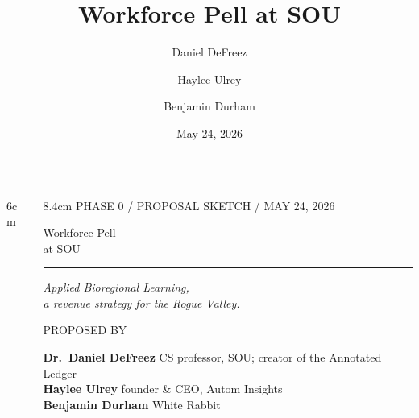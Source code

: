 \documentclass[aspectratio=169,11pt]{beamer}
\title{Workforce Pell at SOU}
\author{Daniel DeFreez \and Haylee Ulrey \and Benjamin Durham}
\institute{Southern Oregon University \textbullet{} Autom Insights \textbullet{} White Rabbit}
\date{May 24, 2026}
\newcommand{\eyebrow}[1]{%
  {\sffamily\fontsize{7.5pt}{9pt}\selectfont
   \color{textMuted}%
   \MakeUppercase{#1}%
  }%
}
\newcommand{\cubeShape}[3]{%
  \begin{scope}[shift={(#2,#3)},scale=#1,
                every node/.style={font=\scriptsize}]
    \draw[cube wire] (-0.6,-0.4) rectangle (0.6,0.4);
    \draw[cube wire] (0.6,0.4) -- (0.85,0.55) -- (-0.35,0.55) -- (-0.6,0.4);
    \draw[cube wire] (0.6,-0.4) -- (0.85,-0.25) -- (0.85,0.55);
    \draw[cube dash] (-0.6,-0.4) -- (-0.35,-0.25) -- (0.85,-0.25);
    \draw[cube dash] (-0.35,-0.25) -- (-0.35,0.55);
    \fill[cSou]    (-0.42,-0.08) rectangle (-0.27,0.05);
    \fill[cSoredi] (-0.075,0.10) rectangle (0.075,0.23);
    \fill[cBiz]    ( 0.27,-0.08) rectangle ( 0.42,0.05);
    \fill[cWr]     (-0.42, 0.17) rectangle (-0.27,0.30);
    \fill[cRwp]    ( 0.27, 0.17) rectangle ( 0.42,0.30);
  \end{scope}%
}
\begin{document}
{
\begin{frame}[plain]
  \vspace*{0.5cm}
  \begin{columns}[c,onlytextwidth,totalwidth=14.5cm]
    \begin{column}{6cm}
      \centering
    \end{column}
    \begin{column}{8.4cm}
      \eyebrow{Phase 0 / proposal sketch / May 24, 2026}\par
      \vspace{8pt}
      {\displayfont\fontsize{28pt}{32pt}\selectfont\color{textPrimary}%
       Workforce Pell\\at SOU\par}
      \vspace{6pt}
      {\color{oil}\rule{2.6em}{0.7pt}}\par
      \vspace{6pt}
      {\rmfamily\itshape\fontsize{12pt}{15pt}\selectfont
       \color{textSecondary}Applied Bioregional Learning,\\
       a revenue strategy for the Rogue Valley.\par}
      \vspace{10pt}
      \eyebrow{proposed by}\par
      \vspace{2pt}
      {\rmfamily\fontsize{9pt}{12pt}\selectfont
       \color{textPrimary}%
       \textbf{Dr.\ Daniel DeFreez} \;\textemdash{}\; CS professor, SOU; creator of the Annotated Ledger\\
       \textbf{Haylee Ulrey} \;\textemdash{}\; founder \& CEO, Autom Insights\\
       \textbf{Benjamin Durham} \;\textemdash{}\; White Rabbit
       \par}
    \end{column}
  \end{columns}
\end{frame}
}
\end{document}
